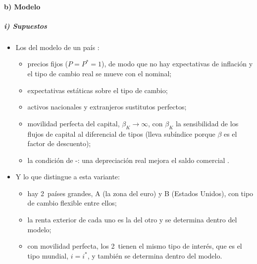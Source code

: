 \documentclass[11pt]{article}
\begin{document}
\paragraph{b) Modelo}
\subparagraph{i) Supuestos}
\begin{itemize}
\item Los del modelo de un país :
  \begin{itemize}
  \item precios fijos ($P=P^*=1$), de modo que no hay expectativas de inflación y el tipo de cambio real se mueve con el nominal;
  \item expectativas estáticas sobre el tipo de cambio;
  \item activos nacionales y extranjeros sustitutos perfectos;
  \item movilidad perfecta del capital, $\beta_K\to\infty$, con $\beta_K$ la sensibilidad de los flujos de capital al diferencial de tipos (lleva subíndice porque $\beta$ es el factor de descuento);
  \item la condición de -: una depreciación real mejora el saldo comercial .
  \end{itemize}
\item Y lo que distingue a esta variante:
  \begin{itemize}
  \item hay 2~países grandes, A (la zona del euro) y B (Estados Unidos), con tipo de cambio flexible entre ellos;
  \item la renta exterior de cada uno es la del otro y se determina dentro del modelo;
  \item con movilidad perfecta, los 2~tienen el mismo tipo de interés, que es el tipo mundial, $i=i^*$, y también se determina dentro del modelo.
  \end{itemize}
\end{itemize}
\end{document}
